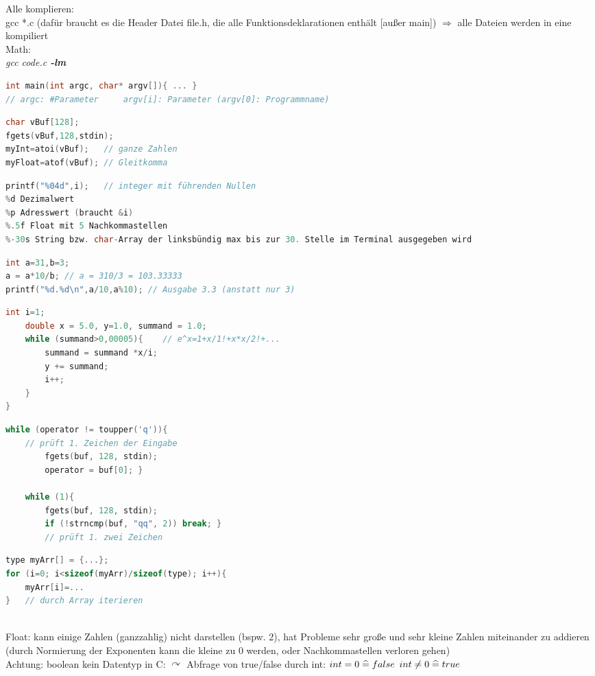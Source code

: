 \begin{multicols*}{3}
Alle komplieren:\\
gcc *.c (dafür braucht es die Header Datei file.h, die alle Funktionsdeklarationen enthält [außer main]) $\Rightarrow$ alle Dateien werden in eine kompiliert \smallskip\\
Math:\\
\emph{gcc code.c \textbf{-lm}}
\HRule[4pt]
\begin{lstlisting}[language=C]
int main(int argc, char* argv[]){ ... } 
// argc: #Parameter		argv[i]: Parameter (argv[0]: Programmname)
\end{lstlisting}
\HDRule[4pt]
\begin{lstlisting}[language=C]
char vBuf[128];
fgets(vBuf,128,stdin); 
myInt=atoi(vBuf);	// ganze Zahlen
myFloat=atof(vBuf); // Gleitkomma
\end{lstlisting}
\HDRule[4pt]
\begin{lstlisting}[language=C]
printf("%04d",i);	// integer mit führenden Nullen
%d Dezimalwert
%p Adresswert (braucht &i)
%.5f Float mit 5 Nachkommastellen
%-30s String bzw. char-Array der linksbündig max bis zur 30. Stelle im Terminal ausgegeben wird
\end{lstlisting}
\HDRule[4pt]
\begin{lstlisting}[language=C]
int a=31,b=3;
a = a*10/b;	// a = 310/3 = 103.33333
printf("%d.%d\n",a/10,a%10); // Ausgabe 3.3 (anstatt nur 3)
\end{lstlisting}
\HDRule[4pt]
\begin{lstlisting}[language=C]
	int i=1;
	double x = 5.0, y=1.0, summand = 1.0;
	while (summand>0,00005){	// e^x=1+x/1!+x*x/2!+...
		summand = summand *x/i;
		y += summand;
		i++;
	}
}
\end{lstlisting}
\HDRule[4pt]
\begin{lstlisting}[language=C]
	while (operator != toupper('q')){	
	// prüft 1. Zeichen der Eingabe
		fgets(buf, 128, stdin);
		operator = buf[0]; }
		
	while (1){
		fgets(buf, 128, stdin);
		if (!strncmp(buf, "qq", 2)) break; }	
		// prüft 1. zwei Zeichen
\end{lstlisting}
\HDRule[4pt]
\begin{lstlisting}[language=C]
type myArr[] = {...};
for (i=0; i<sizeof(myArr)/sizeof(type); i++){
	myArr[i]=...
}	// durch Array iterieren
\end{lstlisting}
\HRule[4pt]
\\
Float: kann einige Zahlen (ganzzahlig) nicht darstellen (bspw. 2), hat Probleme sehr große und sehr kleine Zahlen miteinander zu addieren (durch Normierung der Exponenten kann die kleine zu 0 werden, oder Nachkommastellen verloren gehen)\\
Achtung: boolean kein Datentyp in C: $\curvearrowright$ Abfrage von true/false durch int: 
$int=0\;\widehat{=}\; false$ \;
$int \not =0 \;\widehat{=}\; true$


\end{multicols*}

